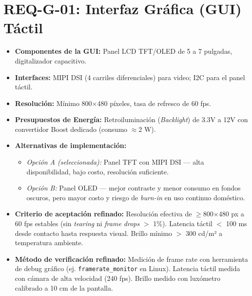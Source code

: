 \documentclass[%
	paper=a4,
	twoside=false,
	parskip=half,
	chapterprefix=false,
	10pt,
	headings=normal,
	bibliography=totoc,
	listof=totoc,
	titlepage=on,
	captions=tableabove,
	draft=false, 
]{scrbook}%
\begin{document}
\section{REQ-G-01: Interfaz Gráfica (GUI) Táctil}
\begin{itemize}
    \item \textbf{Componentes de la GUI:} Panel LCD TFT/OLED de 5 a 7 pulgadas, digitalizador capacitivo.
    \item \textbf{Interfaces:} MIPI DSI (4 carriles diferenciales) para video; I2C para el panel táctil.
    \item \textbf{Resolución:} Mínimo 800$\times$480 píxeles, tasa de refresco de 60 fps.
    \item \textbf{Presupuestos de Energía:} Retroiluminación (\textit{Backlight}) de 3.3V a 12V con convertidor Boost dedicado (consumo $\approx$2 W).
    \item \textbf{Alternativas de implementación:}
        \begin{itemize}
            \item \textit{Opción A (seleccionada):} Panel TFT con MIPI DSI — alta disponibilidad, bajo costo, resolución suficiente.
            \item \textit{Opción B:} Panel OLED — mejor contraste y menor consumo en fondos oscuros, pero mayor costo y riesgo de \textit{burn-in} en uso continuo doméstico.
        \end{itemize}
    \item \textbf{Criterio de aceptación refinado:} Resolución efectiva de $\geq$800$\times$480 px a 60 fps estables (sin \textit{tearing} ni \textit{frame drops} $>$ 1\%). Latencia táctil $<$ 100 ms desde contacto hasta respuesta visual. Brillo mínimo $>$ 300 cd/m² a temperatura ambiente.
    \item \textbf{Método de verificación refinado:} Medición de frame rate con herramienta de debug gráfico (ej. \texttt{framerate\_monitor} en Linux). Latencia táctil medida con cámara de alta velocidad (240 fps). Brillo medido con luxómetro calibrado a 10 cm de la pantalla.
\end{itemize}

\end{document}
